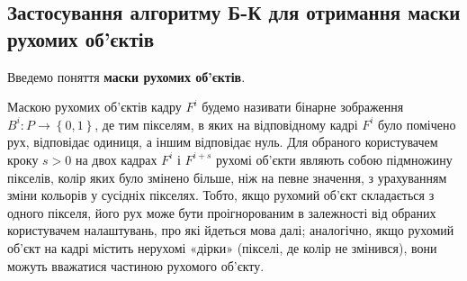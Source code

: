 \subsection{Застосування алгоритму Б-К для отримання маски рухомих об'єктів}

Введемо поняття \textbf{маски рухомих об'єктів}.

Маскою рухомих об'єктів кадру \(F^{i}\) будемо називати бінарне
зображення \(B^{i}:P \rightarrow \left\{ 0,1 \right\}\), де тим
пікселям, в яких на відповідному кадрі \(F^{i}\) було помічено рух,
відповідає одиниця, а іншим відповідає нуль. Для обраного користувачем
кроку \(s > 0\) на двох кадрах \(F^{i}\) і \(F^{i + s}\) рухомі об'єкти
являють собою підмножину пікселів, колір яких було змінено більше, ніж
на певне значення, з урахуванням зміни кольорів у сусідніх пікселях.
Тобто, якщо рухомий об'єкт складається з одного пікселя, його рух може
бути проігнорованим в залежності від обраних користувачем налаштувань,
про які йдеться мова далі; аналогічно, якщо рухомий об'єкт на кадрі
містить нерухомі «дірки» (пікселі, де колір не змінився), вони можуть
вважатися частиною рухомого об'єкту.

